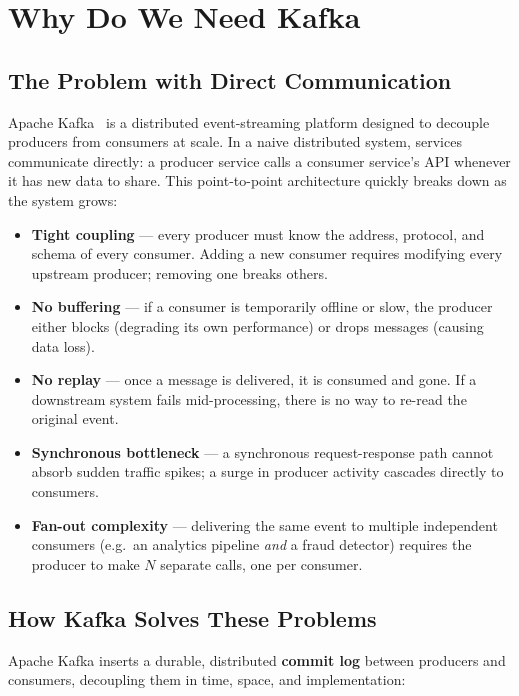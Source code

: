 \section{Why Do We Need Kafka}

\subsection{The Problem with Direct Communication}

Apache Kafka~\cite{kafka,kreps2011kafka} is a distributed event-streaming platform
designed to decouple producers from consumers at scale.
In a naive distributed system, services communicate directly: a producer service calls a
consumer service's API whenever it has new data to share.
This point-to-point architecture quickly breaks down as the system grows:

\begin{itemize}
  \item \textbf{Tight coupling} — every producer must know the address, protocol, and schema of every consumer.
        Adding a new consumer requires modifying every upstream producer; removing one breaks others.
  \item \textbf{No buffering} — if a consumer is temporarily offline or slow, the producer either blocks
        (degrading its own performance) or drops messages (causing data loss).
  \item \textbf{No replay} — once a message is delivered, it is consumed and gone.
        If a downstream system fails mid-processing, there is no way to re-read the original event.
  \item \textbf{Synchronous bottleneck} — a synchronous request-response path cannot absorb sudden
        traffic spikes; a surge in producer activity cascades directly to consumers.
  \item \textbf{Fan-out complexity} — delivering the same event to multiple independent consumers
        (e.g.\ an analytics pipeline \emph{and} a fraud detector) requires the producer to make
        $N$ separate calls, one per consumer.
\end{itemize}

\subsection{How Kafka Solves These Problems}

Apache Kafka inserts a durable, distributed \textbf{commit log} between producers and consumers,
decoupling them in time, space, and implementation:

